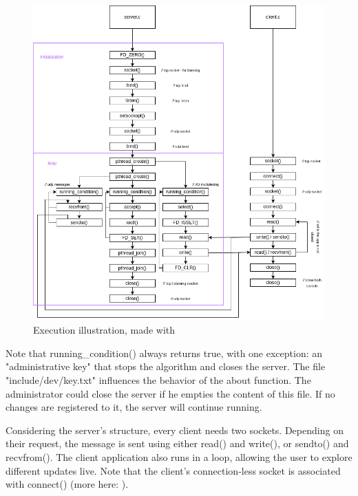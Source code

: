 \documentclass[runningheads]{llncs}
\begin{document}
\newpage
\begin{figure}[!h]
  \includegraphics[width=\textwidth]{RR execution diagram.drawio.png}
  \caption{Execution illustration, made with \cite{diagram-site}} 
  \label{fig:exe}
\end{figure}

Note that running\_condition() always returns true, with one exception: an "administrative key" that stops the algorithm and closes the server. The file "include/dev/key.txt" influences the behavior of the about function. The administrator could close the server if he empties the content of this file. If no changes are registered to it, the server will continue running.

Considering the server's structure, every client needs two sockets. Depending on their request, the message is sent using either read() and write(), or sendto() and recvfrom(). The client application also runs in a loop, allowing the user to explore different updates live. Note that the client's connection-less socket is associated with connect() (more here: \cite{udp-connect}).

\end{document}
